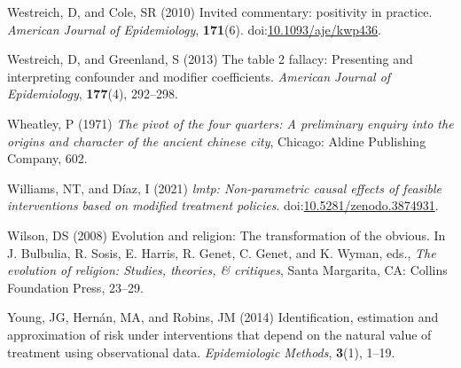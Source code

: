 \documentclass[
  single column]{article}
\newlength{\cslhangindent}
\newenvironment{CSLReferences}[2] %
 {\begin{list}{}{%
  \setlength{\itemindent}{0pt}
  \setlength{\leftmargin}{0pt}
  \setlength{\parsep}{0pt}
  \ifodd #1
   \setlength{\leftmargin}{\cslhangindent}
   \setlength{\itemindent}{-1\cslhangindent}
  \fi
  \setlength{\itemsep}{#2\baselineskip}}}
 {\end{list}}
\begin{document}
\begin{CSLReferences}{1}{0}
Westreich, D, and Cole, SR (2010) Invited commentary: positivity in
practice. \emph{American Journal of Epidemiology}, \textbf{171}(6).
doi:\href{https://doi.org/10.1093/aje/kwp436}{10.1093/aje/kwp436}.

Westreich, D, and Greenland, S (2013) The table 2 fallacy: Presenting
and interpreting confounder and modifier coefficients. \emph{American
Journal of Epidemiology}, \textbf{177}(4), 292--298.

Wheatley, P (1971) \emph{The pivot of the four quarters: A preliminary
enquiry into the origins and character of the ancient chinese city},
Chicago: Aldine Publishing Company, 602.

Williams, NT, and Díaz, I (2021) \emph{{l}mtp: Non-parametric causal
effects of feasible interventions based on modified treatment policies}.
doi:\href{https://doi.org/10.5281/zenodo.3874931}{10.5281/zenodo.3874931}.

Wilson, DS (2008) Evolution and religion: The transformation of the
obvious. In J. Bulbulia, R. Sosis, E. Harris, R. Genet, C. Genet, and K.
Wyman, eds., \emph{The evolution of religion: Studies, theories, \&
critiques}, Santa Margarita, CA: Collins Foundation Press, 23--29.

Young, JG, Hernán, MA, and Robins, JM (2014) Identification, estimation
and approximation of risk under interventions that depend on the natural
value of treatment using observational data. \emph{Epidemiologic
Methods}, \textbf{3}(1), 1--19.

\end{CSLReferences}
\end{document}
